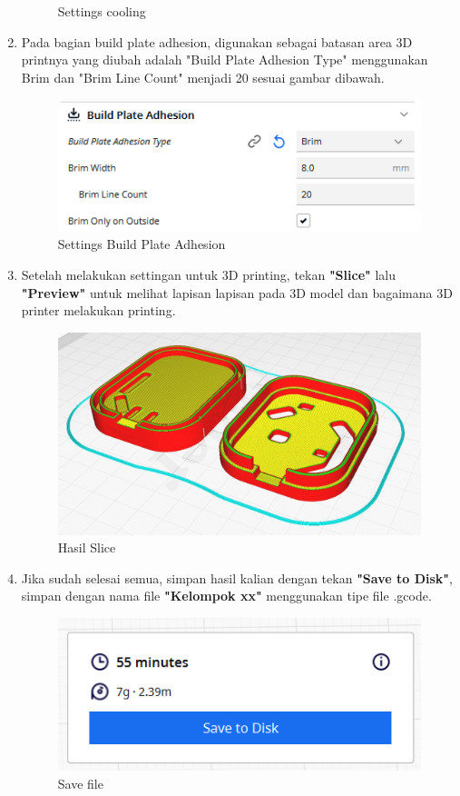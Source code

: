 \begin{enumerate}
\begin{figure}[H]
        \caption{Settings cooling}
        \label{fig:Settings Cooling}
    \end{figure}
    \item Pada bagian build plate adhesion, digunakan sebagai batasan area 3D printnya
    yang diubah adalah "Build Plate Adhesion Type" menggunakan Brim dan "Brim Line Count" menjadi 20 sesuai gambar dibawah.
    \begin{figure}[H]
        \centering
        \includegraphics[width=0.7\linewidth]{P3/img/Settings Build.png}
        \caption{Settings Build Plate Adhesion}
        \label{fig:Settings Build Plate Adhesion}
    \end{figure}
    \item Setelah melakukan settingan untuk 3D printing, tekan \textbf{"Slice"} lalu \textbf{"Preview"} untuk melihat lapisan lapisan pada 3D model dan
    bagaimana 3D printer melakukan printing.
    \begin{figure}[H]
        \centering
        \includegraphics[width=0.6\linewidth]{P3/img/Hasil slice 2.jpg}
        \caption{Hasil Slice}
        \label{fig:Hasil Slice}
    \end{figure}
    \item Jika sudah selesai semua, simpan hasil kalian dengan tekan \textbf{"Save to Disk"}, simpan dengan nama file \textbf{"Kelompok xx"} menggunakan tipe file .gcode.
    \begin{figure}[H]
        \centering
        \includegraphics[width=0.5\linewidth]{P3/img/Save file.png}
        \caption{Save file}
        \label{fig:Save file}
    \end{figure}
\end{enumerate}